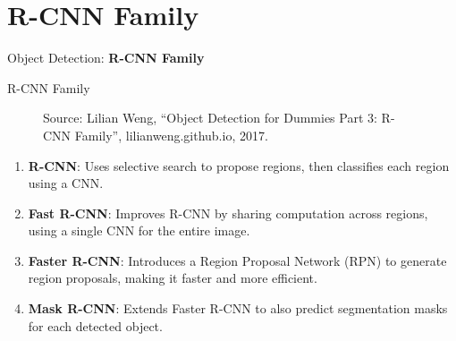 \section{R-CNN Family}
\begin{frame}{}
    \LARGE Object Detection: \textbf{R-CNN Family}
\end{frame}

\begin{frame}[allowframebreaks]{R-CNN Family}
    \begin{figure}
        \centering
        \caption*{\scriptsize Source: Lilian Weng, ``Object Detection for Dummies Part 3: R-CNN Family'', lilianweng.github.io, 2017.}
    \end{figure}

    \framebreak

    \begin{enumerate}
        \setlength{\itemsep}{1em}
        \item \textbf{R-CNN}: Uses selective search to propose regions, then classifies each region using a CNN.
        \item \textbf{Fast R-CNN}: Improves R-CNN by sharing computation across regions, using a single CNN for the entire image.
        \item \textbf{Faster R-CNN}: Introduces a Region Proposal Network (RPN) to generate region proposals, making it faster and more efficient.
        \item \textbf{Mask R-CNN}: Extends Faster R-CNN to also predict segmentation masks for each detected object.
    \end{enumerate}
\end{frame}





